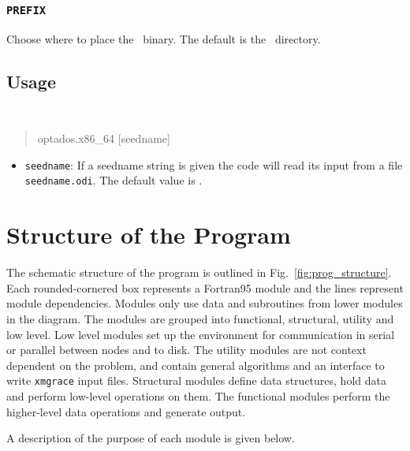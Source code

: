 \documentclass[a4paper,11pt,twoside]{book}
\begin{document}
{\subsection[bin_dir]{\tt PREFIX}
Choose where to place the \optados\ binary. The default is the \optados\ directory.


\section{Usage}
{\tt
\begin{quote}
optados.x86\_64  [seedname]
\end{quote} }
\begin{itemize}
\item{  {\tt seedname}: If a seedname string is given the code will read its input from a file {\tt seedname.odi}. The default value is \castep.}
\end{itemize}


\chapter{Structure of the Program} \label{sec:structure}
The schematic structure of the program is outlined in Fig.~\ref{fig:prog_structure}.
%
Each rounded-cornered box represents a Fortran95 module and the lines represent module dependencies.
%
Modules only use data and subroutines from lower modules in the diagram.
%
The modules are grouped into functional, structural, utility and low level.
%
Low level modules set up the environment for communication in serial or parallel between nodes and to disk.
%
The utility modules are not context dependent on the problem, and contain general algorithms and an interface to write \texttt{xmgrace} input files.
%
Structural modules define data structures, hold data and perform low-level operations on them.
%
The functional modules perform the higher-level data operations and generate output.

%
A description of the purpose of each module is given below.


}
\end{document}
